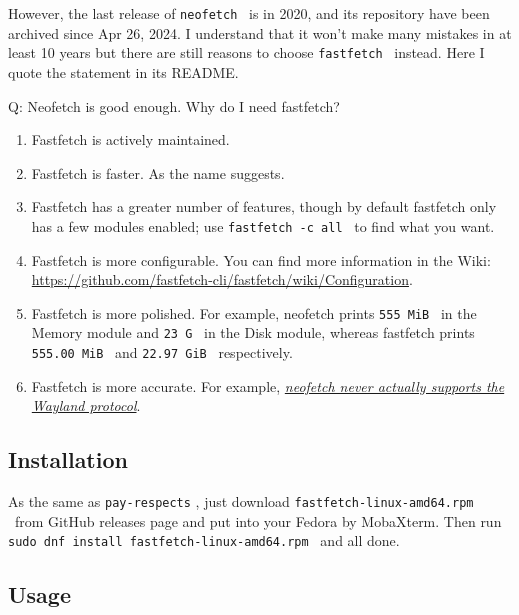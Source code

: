 \documentclass[lang=en,color=blue,12pt]{elegantbook}
\let\oldtexttt\texttt
\renewcommand{\texttt}[1]{%
  \begingroup
  \setlength{\fboxsep}{1pt}%
  \colorbox{gray!10}{\oldtexttt{#1}}%
  \endgroup
}
\begin{document}
However, the last release of \texttt{neofetch}\ is in 2020, and its
repository have been archived since Apr 26, 2024. I understand that it
won't make many mistakes in at least 10 years but there
are still reasons to choose \texttt{fastfetch}\ instead. Here I quote the
statement in its README.

\begin{note}
Q: Neofetch is good enough. Why do I need fastfetch?

\begin{enumerate}
\def\labelenumi{\arabic{enumi}.}
\setlength{\itemsep}{0pt}
\setlength{\parskip}{0pt}
\item
  Fastfetch is actively maintained.
\item
  Fastfetch is faster. As the name suggests.
\item
  Fastfetch has a greater number of features, though by default
  fastfetch only has a few modules enabled;
  use \texttt{fastfetch\ -c\ all}\ to find what you want.
\item
  Fastfetch is more configurable. You can find more information in the
  Wiki: \url{https://github.com/fastfetch-cli/fastfetch/wiki/Configuration}.
\item
  Fastfetch is more polished. For example, neofetch
  prints \texttt{555\ MiB}\ in the Memory module and \texttt{23\ G}\ in
  the Disk module, whereas fastfetch
  prints \texttt{555.00\ MiB}\ and \texttt{22.97\ GiB}\ respectively.
\item
  Fastfetch is more accurate. For
  example, \href{https://github.com/dylanaraps/neofetch/pull/2395}{\textit{neofetch
  never actually supports the Wayland protocol}}.
\end{enumerate}
\end{note}

\subsection*{Installation}

As the same as \texttt{pay-respects}, just download
\texttt{fastfetch-linux-amd64.rpm}\ from GitHub releases page and put
into your Fedora by MobaXterm. Then run \\
\texttt{sudo\ dnf\ install\ fastfetch-linux-amd64.rpm}\ and all done.

\subsection*{Usage}
\end{document}
